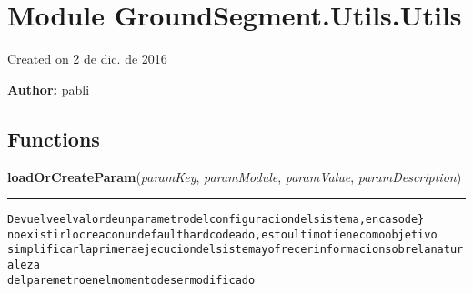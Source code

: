 %
%
%


\section{Module GroundSegment.Utils.Utils}

    \label{GroundSegment:Utils:Utils}
Created on 2 de dic. de 2016

\textbf{Author:} pabli





  \subsection{Functions}

    \label{GroundSegment:Utils:Utils:loadOrCreateParam}

    \vspace{0.5ex}

\hspace{.8\funcindent}\begin{boxedminipage}{\funcwidth}

    \raggedright \textbf{loadOrCreateParam}(\textit{paramKey}, \textit{paramModule}, \textit{paramValue}, \textit{paramDescription})

    \vspace{-1.5ex}

    \rule{\textwidth}{0.5\fboxrule}
\setlength{\parskip}{2ex}
\begin{alltt}

Devuelve el valor de un parametro del configuracion del sistema, en caso de\}
no existir lo crea con un default hardcodeado, esto ultimo tiene como objetivo
simplificar la primera ejecucion del sistema y ofrecer informacion sobre la naturaleza
del paremetro en el momento de ser modificado
\end{alltt}

\setlength{\parskip}{1ex}
    \end{boxedminipage}

